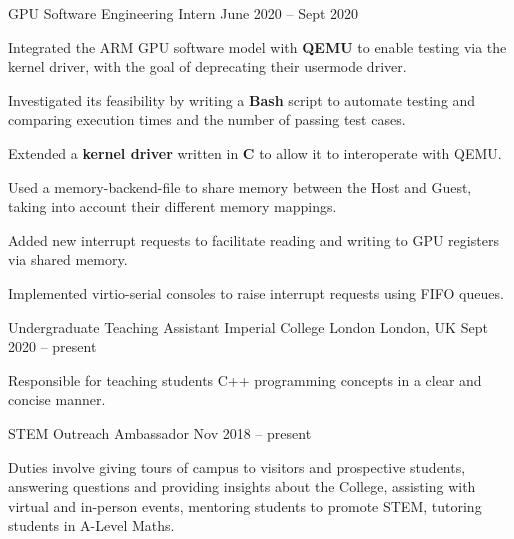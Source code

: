 \begin{cventries}
\cventry
{GPU Software Engineering Intern} %
{} %
{} %
{June 2020 -- Sept 2020} %
{
  \begin{cvitems} %
    \item Integrated the ARM GPU software model with \textbf{QEMU} to enable testing via the kernel driver, with the goal of deprecating their usermode driver.
    \item Investigated its feasibility by writing a \textbf{Bash} script to automate testing and comparing execution times and the number of passing test cases.
    \item Extended a \textbf{kernel driver} written in \textbf{C} to allow it to interoperate with QEMU.
    \item Used a memory-backend-file to share memory between the Host and Guest, taking into account their different memory mappings.
    \item Added new interrupt requests to facilitate reading and writing to GPU registers via shared memory.
    \item Implemented virtio-serial consoles to raise interrupt requests using FIFO queues.
  \end{cvitems}
}


\cventry
{Undergraduate Teaching Assistant} %
{Imperial College London} %
{London, UK} %
{Sept 2020 -- present} %
{
  \begin{cvitems} %
    \item Responsible for teaching students C++ programming concepts in a clear and concise manner.
  \end{cvitems}
}

\cventry
{STEM Outreach Ambassador} %
{} %
{} %
{Nov 2018 -- present} %
{
  \begin{cvitems} %
    \item Duties involve giving tours of campus to visitors and prospective students, answering questions and providing insights about the College, assisting with virtual and in-person events, mentoring students to promote STEM, tutoring students in A-Level Maths.
  \end{cvitems}
}



\end{cventries}
